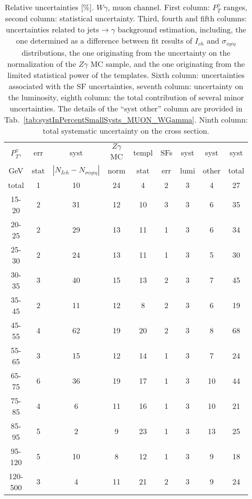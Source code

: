 \begin{table}[h]
  \scriptsize
  \begin{center}
  \caption{Relative uncertainties [\%]. $W\gamma$, muon channel. First column: $P_T^{\gamma}$ ranges, second column: statistical uncertainty. Third, fourth and fifth columns: uncertainties related to jets$\rightarrow\gamma$ background estimation, including, the one determined as a difference between fit results of $I_{ch}$ and $\sigma_{i\eta i\eta}$ distributions, the one originating from the uncertainty on the normalization of the $Z\gamma$ MC sample, and the one originating from the limited statistical power of the templates. Sixth column: uncertainties associated with the SF uncertainties, seventh column: uncertainty on the luminosity, eighth column: the total contribution of several minor uncertainties. The details of the ``syst other'' column are provided in Tab.~\ref{tab:systInPercentSmallSysts_MUON_WGamma}. Ninth column: total systematic uncertainty on the cross section.}
   \begin{tabular}{|c|c|c|c|c|c|c|c|c|}
    $P_T^{\gamma}$,  & err & syst                          & $Z\gamma$ MC & templ & SFs & syst & syst & syst\\
    GeV           & stat & $|N_{Ich}-N_{\sigma{i\eta i\eta}}|$ & norm         & stat  & err & lumi & other & total\\ \hline
    total  & 1 & 10 & 24 & 4 & 2 & 3 & 4 & 27 \\ \hline
    15-20 & 2 & 31 & 12 & 10 & 3 & 3 & 6 & 35 \\ \hline
    20-25 & 2 & 29 & 13 & 11 & 1 & 3 & 6 & 34 \\ \hline
    25-30 & 2 & 24 & 13 & 11 & 1 & 3 & 5 & 30 \\ \hline
    30-35 & 3 & 40 & 15 & 13 & 2 & 3 & 7 & 45 \\ \hline
    35-45 & 2 & 11 & 12 & 8 & 2 & 3 & 6 & 19 \\ \hline
    45-55 & 4 & 62 & 19 & 20 & 2 & 3 & 8 & 68 \\ \hline
    55-65 & 3 & 15 & 12 & 14 & 1 & 3 & 7 & 24 \\ \hline
    65-75 & 6 & 36 & 19 & 17 & 1 & 3 & 10 & 44 \\ \hline
    75-85 & 4 & 6 & 11 & 16 & 1 & 3 & 10 & 21 \\ \hline
    85-95 & 5 & 2 & 9 & 23 & 1 & 3 & 13 & 25 \\ \hline
    95-120 & 5 & 10 & 8 & 12 & 1 & 3 & 9 & 18 \\ \hline
    120-500 & 3 & 4 & 11 & 21 & 2 & 3 & 9 & 24 \\ \hline
  \end{tabular}
  \label{tab:systInPercent_MUON_WGamma}
  \end{center}
\end{table}



